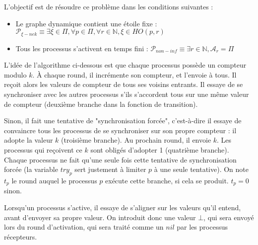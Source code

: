 \documentclass{article}
\begin{document}
L'objectif est de résoudre ce problème dans les conditions suivantes :
\begin{itemize}

	\item Le graphe dynamique contient une étoile fixe : $\mathcal{P}_{\xi-nek} \equiv \exists \xi \in \Pi, \forall p \in \Pi, \forall r \in \mathds{N}, \xi \in HO(p, r)$
	\item Tous les processus s'activent en temps fini : $\mathcal{P}_{non-inf} \equiv \exists r \in \mathds{N}, \mathcal{A}_r = \Pi$

\end{itemize}

L'idée de l'algorithme ci-dessous est que chaque processus possède un compteur modulo $k$. À chaque round, il incrémente son compteur, et l'envoie à tous.
Il reçoit alors les valeurs de compteur de tous ses voisins entrants. Il essaye de se synchroniser avec les autres processus s'ils s'accordent tous sur une même valeur de compteur
(deuxième branche dans la fonction de transition).

Sinon, il fait une tentative de "synchronisation forcée", c'est-à-dire il essaye de convaincre tous les processus de se synchroniser sur son propre compteur :
il adopte la valeur $k$ (troisième branche). Au prochain round, il envoie $k$.  Les processus qui reçoivent ce $k$ sont obligés d'adopter 1 (quatrième branche).
Chaque processus ne fait qu'une seule fois cette tentative de synchronisation forcée (la variable $try_p$ sert justement à limiter $p$ à une seule tentative).
On note $t_p$ le round auquel le processus $p$ exécute cette branche, si cela se produit. $t_p = 0$ sinon.

Lorsqu'un processus s'active, il essaye de s'aligner sur les valeurs qu'il entend, avant d'envoyer sa propre valeur.
On introduit donc une valeur $\bot$, qui sera envoyé lors du round d'activation, qui sera traité comme un $nil$ par les processus récepteurs.

\pagebreak[1]
\end{document}
